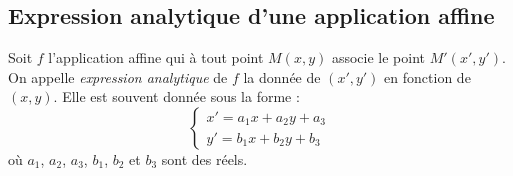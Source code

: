       \subsection{Expression analytique d'une application affine}
            \begin{defi}
                  Soit $f$ l'application affine qui \`a tout point $M(x,y)$ associe le point $M'(x',y')$.
                  On appelle \emph{expression analytique} de $f$ la donn\'ee de $(x',y')$ en fonction de $(x,y)$.
                  Elle est souvent donn\'ee sous la forme : 
                  \begin{equation}
                        \left\lbrace
                              \begin{array}{l}
                                    x' = a_1 x + a_2 y + a_3 \\
                                    y' = b_1 x + b_2 y + b_3 
                              \end{array}
                        \right.
                        \label{eq:expression analytique}
                  \end{equation}
                  o\`u $a_1$, $a_2$, $a_3$, $b_1$, $b_2$ et $b_3$ sont des r\'eels.
            \end{defi}
